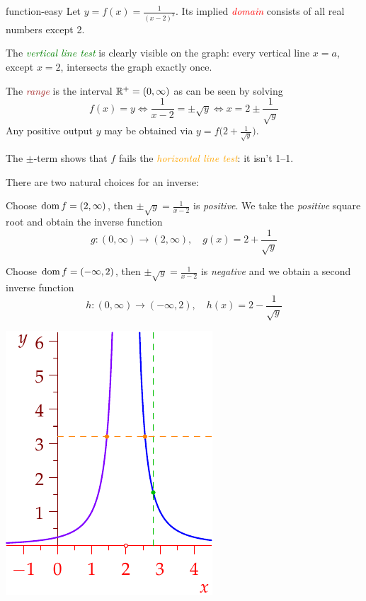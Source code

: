 \begin{example}{}{function-easy}
	Let $y=f(x)=\frac 1{(x-2)^2}$. Its implied \textcolor{red}{\emph{domain}} consists of all real numbers except 2.
	\begin{description}
		\begin{minipage}[t]{0.68\linewidth}\vspace{-7pt}
			\item The \textcolor{Green}{\emph{vertical line test}} is clearly visible on the graph: every vertical line $x=a$, except $x=2$, intersects the graph exactly once.
			\item The \textcolor{Brown}{\emph{range}} is the interval $\mathbb{R}^+=(0,\infty)$ as can be seen by solving
			\[
				f(x)=y\iff \frac 1{x-2}=\pm \sqrt y\iff x=2\pm \frac 1{\sqrt y}
			\]
			Any positive output $y$ may be obtained via $y=f\bigl(2+\frac 1{\sqrt y}\bigr)$.\par
			The $\pm$-term shows that $f$ fails the \textcolor{orange}{\emph{horizontal line test}}: it isn't 1--1.
			\item There are two natural choices for an inverse:
			\begin{enumeratea}
			  \item Choose \textcolor{blue}{$\operatorname{dom} f=(2,\infty)$}, then $\pm\sqrt y=\frac 1{x-2}$ is \emph{positive}. We take the \emph{positive} square root and obtain the inverse function
			  \[
			  	g:(0,\infty)\to(2,\infty),\quad g(x)=2+\frac 1{\sqrt y}
			  \] 
			  \item Choose \textcolor{Purple}{$\operatorname{dom} f=(-\infty,2)$}, then $\pm\sqrt y=\frac 1{x-2}$ is \emph{negative} and we obtain a second inverse function
			  \[
			  	h:(0,\infty)\to(-\infty,2),\quad h(x)=2-\frac 1{\sqrt y}
			  \] 
			\end{enumeratea}
		\end{minipage}
		\hfill
		\begin{minipage}[t]{0.31\linewidth}\vspace{-12pt}
			\flushright
			\includegraphics{functions-easyex1}\par

\end{minipage}
\end{description}
\end{example}
